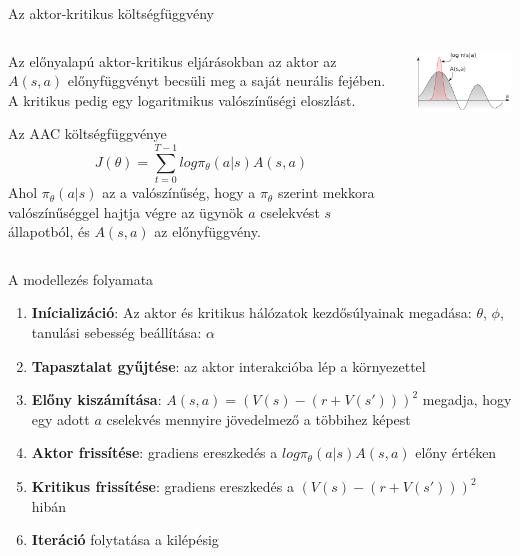 \documentclass[english, aspectratio=169]{beamer}
\begin{document}
\begin{frame}{Az aktor-kritikus költségfüggvény}
\begin{columns}
\begin{column}{.5\textwidth}
Az előnyalapú aktor-kritikus eljárásokban az aktor az $A(s,a)$ előnyfüggvényt becsüli meg a saját neurális fejében. A kritikus pedig egy logaritmikus valószínűségi eloszlást.
\begin{block}{Az AAC költségfüggvénye}
\[
J(\theta) = \sum_{t=0}^{T-1} log \pi_\theta (a \vert s) A(s,a)
\]
Ahol $\pi_\theta (a \vert s)$ az a valószínűség, hogy a $\pi_\theta$ szerint mekkora valószínűséggel hajtja végre az ügynök $a$ cselekvést $s$ állapotból, és $A(s,a)$ az előnyfüggvény.
\end{block}
\end{column}
\begin{column}{.5\textwidth}
\begin{center}
\includegraphics[width=7cm, keepaspectratio]{images/dql_3.png}
\end{center}
\end{column}
\end{columns}
\end{frame}

\begin{frame}{A modellezés folyamata}
\begin{enumerate}
	\item \textbf{Inícializáció}: Az aktor és kritikus hálózatok kezdősúlyainak megadása: $\theta$, $\phi$, tanulási sebesség beállítása: $\alpha$
	\item \textbf{Tapasztalat gyűjtése}: az aktor interakcióba lép a környezettel
	\item \textbf{Előny kiszámítása}: $A(s,a) = (V(s) - (r + V(s')))^2$ megadja, hogy egy adott $a$ cselekvés mennyire jövedelmező a többihez képest
	\item \textbf{Aktor frissítése}: gradiens ereszkedés a $log \pi_\theta (a \vert s) A(s,a)$ előny értéken
	\item \textbf{Kritikus frissítése}: gradiens ereszkedés a $(V(s) - (r + V(s')))^2$ hibán
	\item \textbf{Iteráció} folytatása a kilépésig
\end{enumerate}
\end{frame}
\end{document}
